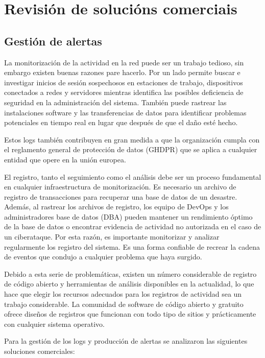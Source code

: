 \chapter{Revisión de solucións comerciais}

\section{Gestión de alertas}

La monitorización de la actividad en la red puede ser un trabajo tedioso, sin embargo existen buenas razones pare hacerlo. Por un lado permite buscar e investigar inicios de sesión sospechosos en estaciones de trabajo, dispositivos conectados a redes y servidores mientras identifica las posibles deficiencia de seguridad en la administración del sistema. También puede rastrear las instalaciones software y las transferencias de datos para identificar problemas potenciales en tiempo real en lugar que después de que el daño esté hecho.

Estos logs también contribuyen en gran medida a que la organización cumpla con el reglamento general de protección de datos  (GHDPR) que se aplica a cualquier entidad que opere en la unión europea.

El registro, tanto el seguimiento como el análisis debe ser un proceso fundamental en cualquier infraestructura de monitorización. Es necesario un archivo de registro de transacciones para recuperar una base de datos de un desastre. Además, al rastrear los archivos de registro, los equipo de DevOps y los administradores base de datos (DBA) pueden mantener un rendimiento óptimo de la base de datos o encontrar evidencia de actividad no autorizada en el caso de un ciberataque. Por esta razón, es importante monitorizar y analizar regularmente los registro del sistema. Es una forma confiable de recrear la cadena de eventos que condujo a cualquier problema que haya surgido.

Debido a esta serie de problemáticas, existen un número considerable de registro de código abierto y herramientas de análisis disponibles en la actualidad, lo que hace que elegir los recursos adecuados para los registros de actividad sea un trabajo considerable. La comunidad de software de código abierto y gratuito ofrece diseños de registros que funcionan con todo tipo de sitios y prácticamente con cualquier sistema operativo. 

Para la gestión de los logs y producción de alertas se analizaron las siguientes soluciones comerciales:


